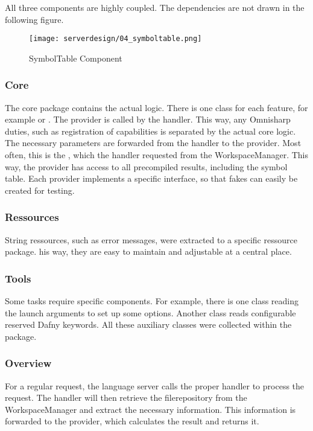 All three components are highly coupled.
The dependencies are not drawn in the following figure.


\begin{figure}[H]
    \centering
    \texttt{[image: serverdesign/04\_symboltable.png]}
    \caption{SymbolTable Component}
    \label{fig:server_st}
\end{figure}

\subsubsection {Core}
The core package contains the actual logic.
There is one class for each feature, for example  or .
The provider is called by the handler.
This way, any Omnisharp duties, such as registration of capabilities is separated by the actual core logic.
The necessary parameters are forwarded from the handler to the provider.
Most often, this is the , which the handler requested from the WorkspaceManager.
This way, the provider has access to all precompiled results, including the symbol table.
Each provider implements a specific interface, so that fakes can easily be created for testing.


\subsubsection{Ressources}
String ressources, such as error messages, were extracted to a specific ressource package.
his way, they are easy to maintain and adjustable at a central place.

\subsubsection{Tools}
Some tasks require specific components.
For example, there is one class reading the launch arguments to set up some options.
Another class reads configurable reserved Dafny keywords.
All these auxiliary classes were collected within the  package.

\subsubsection{Overview}
For a regular request, the language server calls the proper handler to process the request.
The handler will then retrieve the filerepository from the WorkspaceManager and extract the necessary information.
This information is forwarded to the provider, which calculates the result and returns it.

